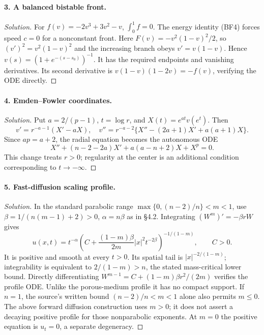 \Needspace{30mm}
\paragraph{3. A balanced bistable front.}
\begin{proof}[Solution]
For $f(v)=-2v^3+3v^2-v$, $\int_0^1f=0$.
The energy identity (BF4) forces speed $c=0$ for a nonconstant front.
Here $F(v)=-v^2(1-v)^2/2$, so
$(v')^2=v^2(1-v)^2$ and the increasing branch obeys $v'=v(1-v)$.
Hence $v(s)=(1+e^{-(s-s_0)})^{-1}$.
It has the required endpoints and vanishing derivatives.
Its second derivative is $v(1-v)(1-2v)=-f(v)$,
verifying the ODE directly.
\end{proof}

\Needspace{30mm}
\paragraph{4. Emden--Fowler coordinates.}
\begin{proof}[Solution]
Put $a=2/(p-1)$, $t=\log r$, and $X(t)=e^{at}v(e^t)$.
Then
\[
 v'=r^{-a-1}(X'-aX),\quad
 v''=r^{-a-2}\{X''-(2a+1)X'+a(a+1)X\}.
\]
Since $ap=a+2$, the radial equation becomes the autonomous ODE
\[
 X''+(n-2-2a)X'+a(a-n+2)X+X^p=0.
\]
This change treats $r>0$; regularity at the center is an additional
condition corresponding to $t\to-\infty$.
\end{proof}

\Needspace{30mm}
\paragraph{5. Fast-diffusion scaling profile.}
\begin{proof}[Solution]
In the standard parabolic range $\max\{0,(n-2)/n\}<m<1$, use
$\beta=1/(n(m-1)+2)>0$, $\alpha=n\beta$ as in \S4.2.
Integrating $(W^m)'=-\beta rW$ gives
\[
 u(x,t)=t^{-\alpha}
 \left(C+\frac{(1-m)\beta}{2m}|x|^2t^{-2\beta}\right)^{-1/(1-m)},
 \qquad C>0.
\]
It is positive and smooth at every $t>0$.
Its spatial tail is $|x|^{-2/(1-m)}$; integrability is equivalent to
$2/(1-m)>n$, the stated mass-critical lower bound.
Directly differentiating $W^{m-1}=C+(1-m)\beta r^2/(2m)$ verifies
the profile ODE.
Unlike the porous-medium profile it has no compact support.
If $n=1$, the source's written bound $(n-2)/n<m<1$ alone
also permits $m\leq0$. The above forward diffusion construction uses
$m>0$; it does not assert a decaying positive profile for those
nonparabolic exponents. At $m=0$ the positive equation is $u_t=0$,
a separate degeneracy.
\end{proof}
\Needspace{45mm}

